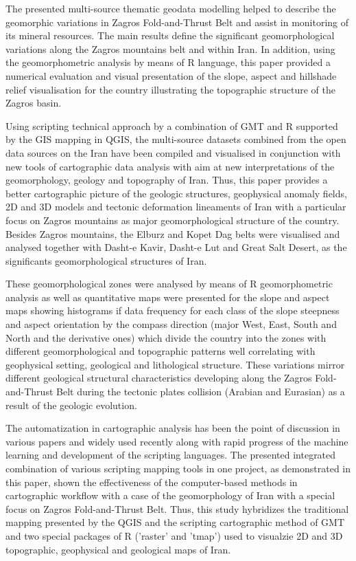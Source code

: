 \documentclass[12pt,a4paper,oneside]{article}
\def \newpar{\vspace{6pt}}
\begin{document}
\newpar The presented multi-source thematic geodata modelling helped to describe the geomorphic variations in Zagros Fold-and-Thrust Belt and assist in monitoring of its mineral resources. The main results define the significant geomorphological variations along the Zagros mountains belt and within Iran. In addition, using the geomorphometric analysis by means of R language, this paper provided a numerical evaluation and visual presentation of the slope, aspect and hillshade relief visualisation for the country illustrating the topographic structure of the Zagros basin.

\newpar Using scripting technical approach by a combination of GMT and R supported by the GIS mapping in QGIS, the multi-source datasets combined from the open data sources on the Iran have been compiled and visualised in conjunction with new tools of cartographic data analysis with aim at new interpretations of the geomorphology, geology and topography of Iran. Thus, this paper provides a better cartographic picture of the geologic structures, geophysical anomaly fields, 2D and 3D models and tectonic deformation lineaments of Iran with a particular focus on Zagros mountains as major geomorphological structure of the country. Besides Zagros mountains, the Elburz and Kopet Dag belts were visualised and analysed together with Dasht-e Kavir, Dasht-e Lut and Great Salt Desert, as the significants geomorphological structures of Iran. 

\newpar These geomorphological zones were analysed by means of R geomorphometric analysis as well as quantitative maps were presented for the slope and aspect maps showing histograms if data frequency for each class of the slope steepness and aspect orientation by the compass direction (major West, East, South and North and the derivative ones) which divide the country into the zones with different geomorphological and topographic patterns well correlating with geophysical setting, geological and lithological structure. These variations mirror different geological structural characteristics developing along the Zagros Fold-and-Thrust Belt during the tectonic plates collision (Arabian and Eurasian) as a result of the geologic evolution. 

\newpar The automatization in cartographic analysis has been the point of discussion in various papers \citep{Schenke,Lemenkova2019c,Gauger} and widely used recently along with rapid progress of the machine learning and development of the scripting languages. The presented integrated combination of various scripting mapping tools in one project, as demonstrated in this paper, shown the effectiveness of the computer-based methods in cartographic workflow with a case of the geomorphology of Iran with a special focus on Zagros Fold-and-Thrust Belt. Thus, this study hybridizes the traditional mapping presented by the QGIS and the scripting cartographic method of GMT and two special packages of R ('raster' and 'tmap') used to visualzie 2D and 3D topographic,  geophysical and geological maps of Iran. 
\end{document}
